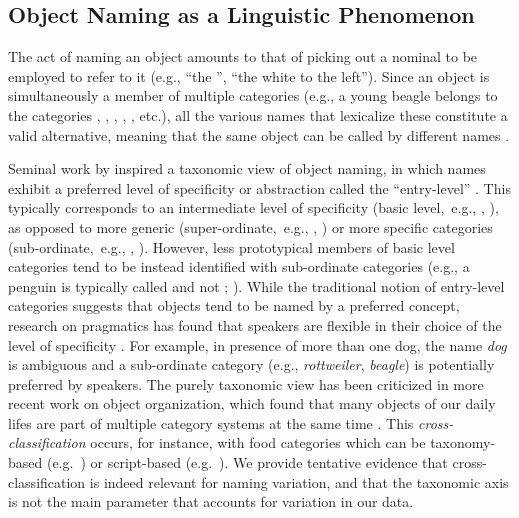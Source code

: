 \subsection{Object Naming as a Linguistic Phenomenon}
\label{subsec:rosch}

The act of naming an object amounts to that of picking out a nominal to be employed to refer to it (e.g., ``the '', ``the white  to the left'').
Since an object is simultaneously a member of multiple categories (e.g., a young beagle belongs to the categories , , , , , etc.), all the various names that lexicalize these constitute a valid alternative, meaning that the same object can be called by different names \cite{brown1958shall,murphy2004big}.

Seminal work by  inspired a taxonomic view of object naming, in which names exhibit a preferred level of specificity or abstraction called the ``entry-level'' \cite{jolicoeur1984pictures}. 
This typically corresponds to an intermediate level of specificity (basic level,\ e.g., , ), as opposed to more generic (super-ordinate,\ e.g., , ) or more specific categories (sub-ordinate,\ e.g., , ).
However, less prototypical members of basic level categories tend to be instead identified with sub-ordinate categories (e.g., a penguin is typically called  and not ; ). 
While the traditional notion of entry-level categories suggests that objects tend to be named by a  preferred concept, research on pragmatics has found that speakers are flexible in their choice of the level of specificity \cite{olson1970language,rohde2012communicating,graf2016animal}.
For example, in presence of more than one dog, the name \textsl{dog} is ambiguous and a sub-ordinate category (e.g., \textsl{rottweiler}, \textsl{beagle}) is potentially preferred by speakers.
The purely taxonomic view has been criticized in more recent work on object organization, which found that many objects of our daily lifes are part of multiple category systems at the same time \cite{ross1999food,SHAFTO20111}. 
This \textit{cross-classification} occurs, for instance, with food categories which can be taxonomy-based (e.g.\ ) or script-based (e.g.\  ).
We provide tentative evidence that cross-classification is indeed relevant for naming variation, and that the taxonomic axis is not the main parameter that accounts for variation in our data.

